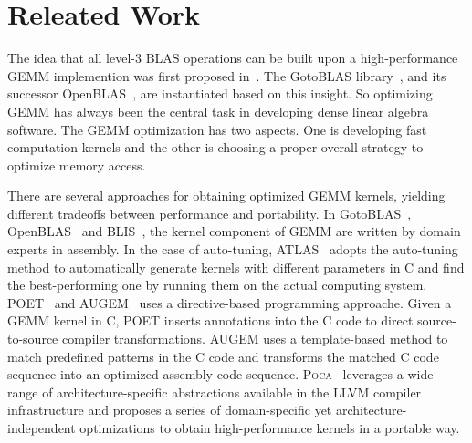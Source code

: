 \section{Releated Work}\label{sec:related}
The idea that all level-3 BLAS operations can be built upon
a high-performance GEMM implemention was first proposed
in~\cite{gemmbased1,gemmbased2}.
The GotoBLAS library~\cite{gotoblas}, and its successor OpenBLAS~\cite{openblas},
are instantiated based on this insight.
So optimizing GEMM has always been the central task in developing
dense linear algebra software.
The GEMM optimization has two aspects.
One is developing fast computation kernels and
the other is choosing a proper overall strategy
to optimize memory access.


There are several approaches for obtaining optimized GEMM kernels,
yielding different tradeoffs between performance and portability.
In GotoBLAS~\cite{gotoblas}, OpenBLAS~\cite{openblas} and BLIS~\cite{blis},
the kernel component of GEMM are written by domain experts in assembly.
In the case of auto-tuning,
ATLAS~\cite{atlas} adopts the auto-tuning method to
automatically generate kernels with different parameters
in C and find the best-performing one by running them
on the actual computing system.
POET~\cite{poet,poetcgo,poetmicro} and AUGEM~\cite{augem} uses a 
directive-based programming approache.
Given a GEMM kernel in C, POET inserts annotations into
the C code to direct source-to-source compiler transformations.
AUGEM uses a template-based method to match
predefined patterns in the C code and transforms the matched
C code sequence into an optimized assembly code sequence.
\textsc{Poca}~\cite{poca} leverages a wide range of architecture-specific
abstractions available in the LLVM compiler infrastructure
and proposes a series of domain-specific yet architecture-independent optimizations
to obtain high-performance kernels in a portable way.

